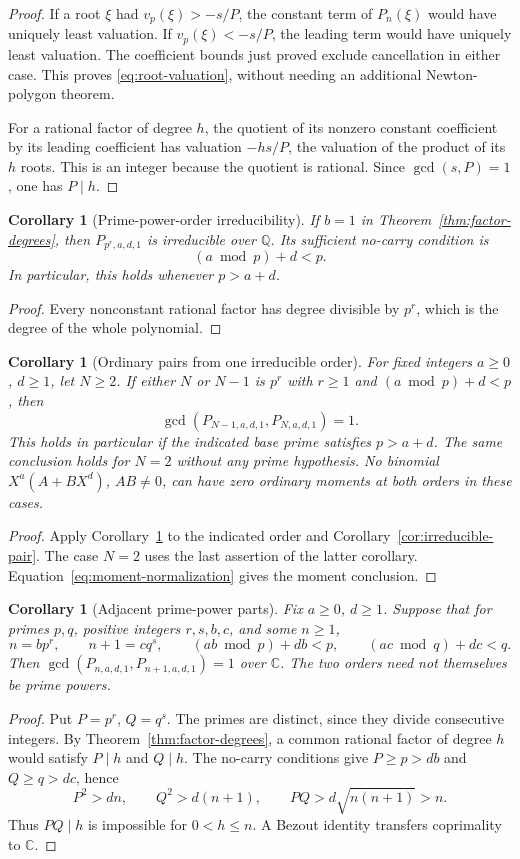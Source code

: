 \documentclass[11pt]{article}
\newtheorem{corollary}[theorem]{Corollary}
\theoremstyle{remark}
\newcommand{\Q}{\mathbb Q}
\newcommand{\C}{\mathbb C}
\newcommand{\vp}{v_p}
\begin{document}
\begin{proof}
If a root $\xi$ had $\vp(\xi)>-s/P$, the constant term of
$P_n(\xi)$ would have uniquely least valuation.
If $\vp(\xi)<-s/P$, the leading term would have uniquely least
valuation. The coefficient bounds just proved exclude cancellation
in either case. This proves \eqref{eq:root-valuation}, without needing
an additional Newton-polygon theorem.

For a rational factor of degree $h$, the quotient of its nonzero
constant coefficient by its leading coefficient has valuation
$-hs/P$, the valuation of the product of its $h$ roots. This is an
integer because the quotient is rational. Since $\gcd(s,P)=1$,
one has $P\mid h$.
\end{proof}

\begin{corollary}[Prime-power-order irreducibility]\label{thm:prime-power-order}
If $b=1$ in Theorem~\ref{thm:factor-degrees}, then
$P_{p^r,a,d,1}$ is irreducible over $\Q$.
Its sufficient no-carry condition is
\[
 (a\bmod p)+d<p.
\]
In particular, this holds whenever $p>a+d$.
\end{corollary}
\begin{proof}
Every nonconstant rational factor has degree divisible by $p^r$,
which is the degree of the whole polynomial.
\end{proof}

\begin{corollary}[Ordinary pairs from one irreducible order]\label{cor:ordinary-orders}
For fixed integers $a\ge0$, $d\ge1$, let $N\ge2$.
If either $N$ or $N-1$ is $p^r$ with $r\ge1$ and
$(a\bmod p)+d<p$, then
\[
 \gcd(P_{N-1,a,d,1},P_{N,a,d,1})=1.
\]
This holds in particular if the indicated base prime satisfies $p>a+d$.
The same conclusion holds for $N=2$ without any prime hypothesis.
No binomial $X^a(A+BX^d)$, $AB\ne0$, can have zero ordinary
moments at both orders in these cases.
\end{corollary}
\begin{proof}
Apply Corollary~\ref{thm:prime-power-order} to the indicated order and
Corollary~\ref{cor:irreducible-pair}. The case $N=2$ uses the last
assertion of the latter corollary. Equation~\eqref{eq:moment-normalization}
gives the moment conclusion.
\end{proof}

\begin{corollary}[Adjacent prime-power parts]\label{cor:adjacent-parts}
Fix $a\ge0$, $d\ge1$. Suppose that for primes $p,q$, positive integers
$r,s,b,c$, and some $n\ge1$,
\[
 n=bp^r,\qquad n+1=cq^s,\qquad
 (ab\bmod p)+db<p,\qquad (ac\bmod q)+dc<q.
\]
Then $\gcd(P_{n,a,d,1},P_{n+1,a,d,1})=1$ over $\C$.
The two orders need not themselves be prime powers.
\end{corollary}
\begin{proof}
Put $P=p^r$, $Q=q^s$. The primes are distinct, since they divide
consecutive integers. By Theorem~\ref{thm:factor-degrees}, a common
rational factor of degree $h$ would satisfy $P\mid h$ and $Q\mid h$.
The no-carry conditions give $P\ge p>db$ and $Q\ge q>dc$, hence
\[
 P^2>dn,\qquad Q^2>d(n+1),\qquad
 PQ>d\sqrt{n(n+1)}>n .
\]
Thus $PQ\mid h$ is impossible for $0<h\le n$.
A Bezout identity transfers coprimality to $\C$.
\end{proof}
\end{document}
